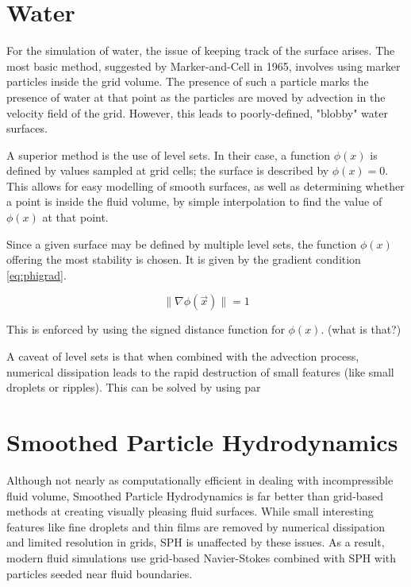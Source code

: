 \documentclass[12pt]{article}
\begin{document}
\section{Water}

For the simulation of water, the issue of keeping track of the surface arises. The most basic method, suggested by Marker-and-Cell in 1965, involves using marker particles inside the grid volume. The presence of such a particle marks the presence of water at that point as the particles are moved by advection in the velocity field of the grid. However, this leads to poorly-defined, "blobby" water surfaces.

A superior method is the use of level sets. In their case, a function $\phi(x)$ is defined by values sampled at grid cells; the surface is described by $\phi(x) = 0$. This allows for easy modelling of smooth surfaces, as well as determining whether a point is inside the fluid volume, by simple interpolation to find the value of $\phi(x)$ at that point.

Since a given surface may be defined by multiple level sets, the function $\phi(x)$ offering the most stability is chosen. It is given by the gradient condition \ref{eq:phigrad}.

\begin{equation}
\|\nabla\phi(\vec{x})\|=1
\label{eq:phigrad}
\end{equation}

This is enforced by using the signed distance function for $\phi(x)$. (what is that?)

A caveat of level sets is that when combined with the advection process, numerical dissipation leads to the rapid destruction of small features (like small droplets or ripples). This can be solved by using par

\section{Smoothed Particle Hydrodynamics}

Although not nearly as computationally efficient in dealing with incompressible fluid volume, Smoothed Particle Hydrodynamics is far better than grid-based methods at creating visually pleasing fluid surfaces. While small interesting features like fine droplets and thin films are removed by numerical dissipation and limited resolution in grids, SPH is unaffected by these issues. As a result, modern fluid simulations use grid-based Navier-Stokes combined with SPH with particles seeded near fluid boundaries.
\end{document}
